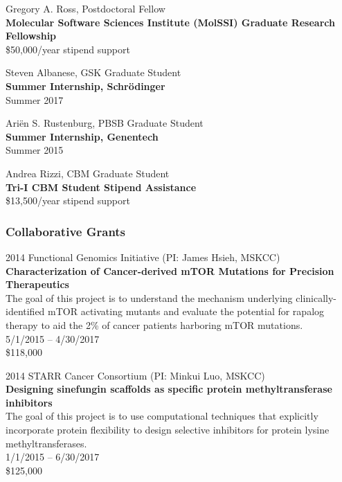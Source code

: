 \documentclass[10pt]{article}
\begin{document}
\vspace{1.5ex}

Gregory A. Ross, Postdoctoral Fellow\\
{\bf Molecular Software Sciences Institute (MolSSI) Graduate Research Fellowship}\\
\$50,000/year stipend support

\vspace{1.5ex}

Steven Albanese, GSK Graduate Student\\
{\bf Summer Internship, Schr\"{o}dinger}\\
Summer 2017

\vspace{1.5ex}

Ari\"{e}n S. Rustenburg, PBSB Graduate Student\\
{\bf Summer Internship, Genentech}\\
Summer 2015

\vspace{1.5ex}

Andrea Rizzi, CBM Graduate Student\\
{\bf Tri-I CBM Student Stipend Assistance}\\
\$13,500/year stipend support

\color{black}

\subsubsection*{Collaborative Grants}

2014 Functional Genomics Initiative (PI: James Hsieh, MSKCC) \\
{\bf Characterization of Cancer-derived mTOR Mutations for Precision Therapeutics} \\
The goal of this project is to understand the mechanism underlying clinically-identified mTOR activating mutants and evaluate the potential for rapalog therapy to aid the 2\% of cancer patients harboring mTOR mutations. \\
5/1/2015 -- 4/30/2017 \\
\$118,000
\color{black}

\vspace{1.5ex}

2014 STARR Cancer Consortium (PI: Minkui Luo, MSKCC) \\
{\bf Designing sinefungin scaffolds as specific protein methyltransferase inhibitors} \\
The goal of this project is to use computational techniques that explicitly incorporate protein flexibility to design selective inhibitors for protein lysine methyltransferases. \\
1/1/2015 -- 6/30/2017 \\
\$125,000
\color{black}
\end{document}
